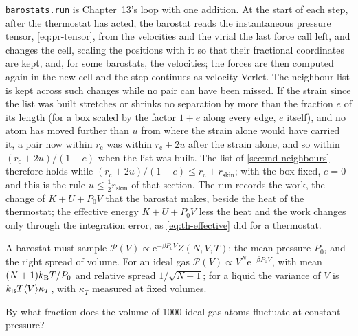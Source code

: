 \texttt{barostats.run} is Chapter~13's loop with one addition. At the
start of each step, after the thermostat has acted, the barostat reads
the instantaneous pressure tensor, \cref{eq:pr-tensor}, from the
velocities and the virial the last force call left, and changes the cell,
scaling the positions with it so that their fractional coordinates are
kept, and, for some barostats, the velocities; the forces are then
computed again in the new cell and the step continues as velocity
Verlet. The neighbour list is kept across such changes while no pair can
have been missed. If the strain since the list was built stretches or
shrinks no separation by more than the fraction $e$ of its length (for a
box scaled by the factor $1 + e$ along every edge, $e$ itself), and no atom
has moved further than $u$ from where the strain alone would have carried
it, a pair now within $r_{\mathrm c}$ was within $r_{\mathrm c} + 2u$ after
the strain alone, and so within $(r_{\mathrm c} + 2u)/(1 - e)$ when the
list was built. The list of \cref{sec:md-neighbours} therefore holds while
$(r_{\mathrm c} + 2u)/(1 - e) \le r_{\mathrm c} + r_{\mathrm{skin}}$; with the
box fixed, $e = 0$ and this is the rule $u \le \frac12r_{\mathrm{skin}}$ of
that section. The run records the work, the change of
$K + U + P_0V$ that the barostat makes, beside the heat of the
thermostat; the effective energy $K + U + P_0V$ less the heat and the work
changes only through the integration error, as \cref{eq:th-effective} did
for a thermostat.

\begin{keyidea}
A barostat must sample $\mathcal{P}(V) \propto \mathrm{e}^{-\beta
P_0V}Z(N, V, T)$: the mean pressure $P_0$, and the right spread of volume.
For an ideal gas $\mathcal{P}(V) \propto V^N\mathrm{e}^{-\beta P_0V}$, with
mean $(N + 1)k_{\mathrm{B}} T/P_0$ and relative spread $1/\sqrt{N + 1}$; for a liquid
the variance of $V$ is $k_{\mathrm{B}} T\langle V \rangle\kappa_T$, with $\kappa_T$ measured at
fixed volumes.
\end{keyidea}

\begin{selfcheck}
By what fraction does the volume of 1000 ideal-gas atoms fluctuate at
constant pressure?
\end{selfcheck}

